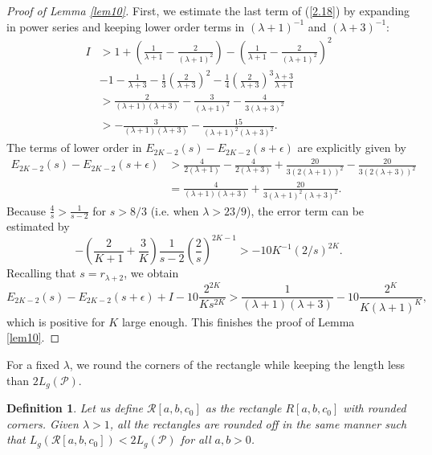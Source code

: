 \documentclass{amsart}
\theoremstyle{Corollary}
\newtheorem{defn}[theorem]{Definition}
\numberwithin{equation}{section}
\begin{document}
\begin{proof}[Proof of Lemma \ref{lem10}]
First, we estimate the last term of (\ref{2.18}) by expanding in power series and keeping lower order terms
in $(\lambda+1)^{-1}$ and $(\lambda+3)^{-1}$:
\begin{equation*}
\begin{split}
I &>1+\left(\frac{1}{\lambda+1}-\frac{2}{(\lambda+1)^2}\right)-\left(\frac{1}{\lambda+1}-\frac{2}{(\lambda+1)^2}\right)^2\\
&-1-\frac{1}{\lambda+3}-\frac{1}{3}\left(\frac{2}{\lambda+3}\right)^2-\frac{1}{4}\left(\frac{2}{\lambda+3}\right)^3\frac{\lambda+3}{\lambda+1}\\
&>\frac{2}{(\lambda+1)(\lambda+3)}-\frac{3}{(\lambda+1)^2}-\frac{4}{3(\lambda+3)^2}\\
&>-\frac{3}{(\lambda+1)(\lambda+3)}-\frac{15}{(\lambda+1)^2(\lambda+3)^2}.
\end{split}
\end{equation*}
The terms of lower order in $E_{2K-2}(s)-E_{2K-2}(s+\epsilon)$ are explicitly given by
\begin{equation*}
\begin{split}
E_{2K-2}(s)-E_{2K-2}(s+\epsilon)&
>\frac{4}{2(\lambda+1)}-\frac{4}{2(\lambda+3)}+\frac{20}{3(2(\lambda+1))^2}-\frac{20}{3(2(\lambda+3))^2}\\
&=\frac{4}{(\lambda+1)(\lambda+3)}+\frac{20}{3(\lambda+1)^2(\lambda+3)^2}.
\end{split}
\end{equation*}
Because $\frac{4}{s}>\frac{1}{s-2}$ for $s>8/3$ (i.e. when $\lambda>23/9$), the error term can be estimated by
$$-\left(\frac{2}{K+1}+\frac{3}{K}\right)\frac{1}{s-2}\left(\frac{2}{s}\right)^{2K-1}
>-10K^{-1}(2/s)^{2K}.$$
Recalling that $s=r_{\lambda+2}$, we obtain
$$E_{2K-2}(s)-E_{2K-2}(s+\epsilon)+I-10\frac{2^{2K}}{Ks^{2K}}>\frac{1}{(\lambda+1)(\lambda+3)}-
10\frac{2^K}{K(\lambda+1)^K},$$
which is positive for $K$ large enough. This finishes the proof of Lemma  \ref{lem10}.
\end{proof}








For a fixed $\lambda$,
we round the corners of the rectangle while keeping the length
less than $2L_g(\mathcal{P})$.

\begin{defn}\label{defn1}
\emph{Let us define $\mathcal{R}[a,b,c_0]$
as the rectangle $R[a,b,c_0]$ with rounded corners.
Given $\lambda>1$, all the rectangles are rounded off in the same manner
such that
$L_g(\mathcal{R}[a,b,c_0])<2L_g(\mathcal{P})$ for all $a,b>0$.
}
\end{defn}
\end{document}
